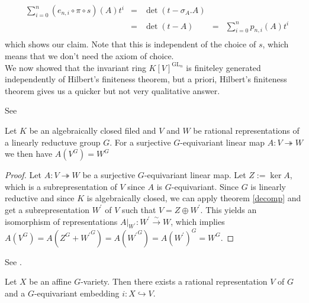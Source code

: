 \begin{dexample}
\begin{equation}
\begin{aligned}
      &\sum_{i=0}^n (e_{n,i} \circ \pi \circ s)(A)t^i&=&\operatorname{det}(t-\sigma_A.A)\\
      &&=&\operatorname{det}(t-A)
      &=&\sum_{i=0}^n p_{n,i}(A)t^i\\
    \end{aligned}
  \end{equation}
  which shows our claim.
  Note that this is independent of the choice of $s$, which means that we don't need the axiom of choice.\\
  We now showed that the invariant ring $K[V]^{\operatorname{GL}_n}$ is finiteley generated independently of Hilbert's finiteness theorem, but a priori, Hilbert's finiteness theorem gives us a quicker but not very qualitative answer.
\end{dexample}

\begin{lemma}\label{bloblo}
  See \cite[2.2.8]{DK15}

  Let $K$ be an algebraically closed filed and $V$ and $W$ be rational representations of a linearly reductuve group $G$.
  For a surjective $G$-equivariant linear map $A \colon V \twoheadrightarrow W$ we then have $A(V^G) = W^G$
\end{lemma}

\begin{proof}
  Let $A \colon V \twoheadrightarrow W$ be a surjective $G$-equivariant linear map.
  Let $Z := \operatorname{ker}A$, which is a subrepresentation of $V$ since $A$ is $G$-equivariant.
  Since $G$ is linearly reductive and since $K$ is algebraically closed, we can apply theorem \ref{decomp} and get a subrepresentation $W^\prime$ of $V$ such that $V = Z \oplus W^\prime$.
  This yields an isomorphism of representations $\left. A \right|_{W^\prime} \colon W^\prime \xrightarrow{\sim} W$, which implies $A(V^G) = A(Z^G + {W^\prime}^G) = A({W^\prime}^G) = A(W^\prime)^G = W^G$.
\end{proof}

\begin{lemma}\label{emb}
  See \cite[A1.9]{DK15}.
  
  Let $X$ be an affine $G$-variety.
  Then there exists a rational representation $V$ of $G$ and a $G$-equivariant embedding $i \colon X \hookrightarrow V$.
\end{lemma}


